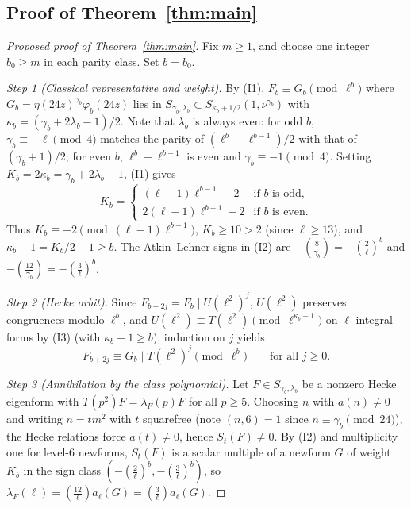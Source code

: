 \documentclass[11pt,reqno]{amsart}
\theoremstyle{definition}
\theoremstyle{remark}
\newcommand{\legendre}[2]{\left(\frac{#1}{#2}\right)}
\begin{document}
\subsection{Proof of Theorem~\ref{thm:main}}
\begin{proof}[Proposed proof of Theorem~\ref{thm:main}]
Fix $m \ge 1$, and choose one integer $b_0 \ge m$ in each parity class. Set $b = b_0$.

\emph{Step 1 (Classical representative and weight).} By (I1), $F_b \equiv G_b \pmod{\ell^b}$ where $G_b = \eta(24z)^{\gamma_b}\varphi_b(24z)$ lies in $S_{\gamma_b, \lambda_b} \subset S_{\kappa_b + 1/2}(1, \nu^{\gamma_b})$ with $\kappa_b = (\gamma_b + 2\lambda_b - 1)/2$. Note that $\lambda_b$ is always even: for odd $b$, $\gamma_b \equiv -\ell \pmod{4}$ matches the parity of $(\ell^b - \ell^{b-1})/2$ with that of $(\gamma_b+1)/2$; for even $b$, $\ell^b - \ell^{b-1}$ is even and $\gamma_b \equiv -1 \pmod{4}$. Setting $K_b = 2\kappa_b = \gamma_b + 2\lambda_b - 1$, (I1) gives
\[
  K_b = \begin{cases}
    (\ell - 1)\ell^{b-1} - 2 & \text{if $b$ is odd,}\\
    2(\ell - 1)\ell^{b-1} - 2 & \text{if $b$ is even.}
  \end{cases}
\]
Thus $K_b \equiv -2 \pmod{(\ell-1)\ell^{b-1}}$, $K_b \ge 10 > 2$ (since $\ell \ge 13$), and $\kappa_b - 1 = K_b/2 - 1 \ge b$. The Atkin--Lehner signs in (I2) are $-\legendre{8}{\gamma_b} = -\legendre{2}{\ell}^b$ and $-\legendre{12}{\gamma_b} = -\legendre{3}{\ell}^b$.

\emph{Step 2 (Hecke orbit).} Since $F_{b+2j} = F_b \mid U(\ell^2)^j$, $U(\ell^2)$ preserves congruences modulo $\ell^b$, and $U(\ell^2) \equiv T(\ell^2) \pmod{\ell^{\kappa_b-1}}$ on $\ell$-integral forms by (I3) (with $\kappa_b - 1 \ge b$), induction on $j$ yields
\[
  F_{b+2j} \equiv G_b \mid T(\ell^2)^j \pmod{\ell^b} \qquad \text{for all } j \ge 0.
\]

\emph{Step 3 (Annihilation by the class polynomial).} Let $F \in S_{\gamma_b, \lambda_b}$ be a nonzero Hecke eigenform with $T(p^2) F = \lambda_F(p) F$ for all $p \ge 5$. Choosing $n$ with $a(n) \neq 0$ and writing $n = tm^2$ with $t$ squarefree (note $(n,6)=1$ since $n \equiv \gamma_b \pmod{24}$), the Hecke relations force $a(t) \neq 0$, hence $S_t(F) \neq 0$. By (I2) and multiplicity one for level-$6$ newforms, $S_t(F)$ is a scalar multiple of a newform $G$ of weight $K_b$ in the sign class $(-\legendre{2}{\ell}^b, -\legendre{3}{\ell}^b)$, so $\lambda_F(\ell) = \legendre{12}{\ell} a_\ell(G) = \legendre{3}{\ell} a_\ell(G)$.


\end{proof}
\end{document}
